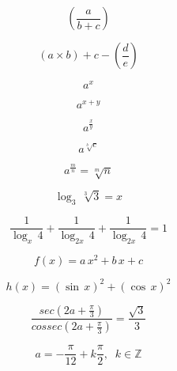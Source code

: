 \documentclass[12pt,a4paper, oneside]{book}
\begin{document}

\begin{equation}
\left(\frac{a}{b + c}\right)
\end{equation}

\begin{equation}
(a \times b) + c - \left(\frac{d}{e}\right)
\end{equation}

\begin{equation}
a^x
\end{equation}

\begin{equation}
a^{x + y}
\end{equation}

\begin{equation}
a^{\frac{x}{y}}
\end{equation}

\begin{equation}
a^{\sqrt[b]{c}}
\end{equation}

\begin{equation}
a^{\frac{m}{n}} = \sqrt[m]{n}
\end{equation}

\begin{equation}
\log_3 \, {\sqrt[3]{3}} = x
\end{equation}

\begin{equation}
\frac{1}{\log_x \, 4} + \frac{1}{\log_{2x} \, 4} + \frac{1}{\log_{2x} \, 4} = 1 
\end{equation}

\begin{equation}
f(x) = a\,x^2 + b\,x + c
\end{equation}

\begin{equation}
h(x) = (\sin \, x)^2 + (\cos \, x)^2
\end{equation}

\begin{equation}
\frac{sec\left(2a + \frac{\pi}{3}\right)}{cossec \left(2a + \frac{\pi}{3}\right)} = \frac{\sqrt{3}}{3}
\end{equation}

\begin{equation}
a = -\frac{\pi}{12} + k\frac{\pi}{2}, \; \; k \in \mathbb{Z}
\end{equation}
\end{document}
